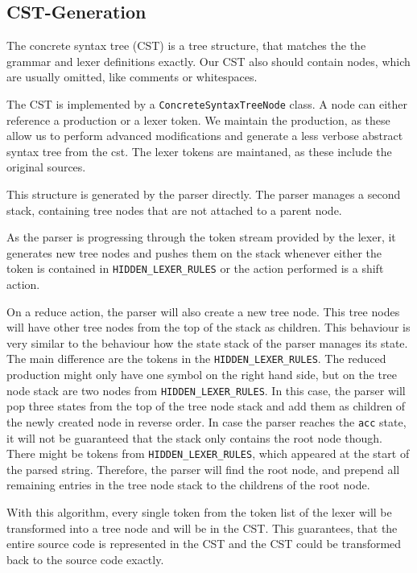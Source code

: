 \subsection{CST-Generation}

The concrete syntax tree (CST) is a tree structure, that matches the the grammar and lexer definitions exactly. Our CST also should contain nodes, which are usually omitted, like comments or whitespaces.

The CST is implemented by a \verb|ConcreteSyntaxTreeNode| class. A node can either reference a production or a lexer token. We maintain the production, as these allow us to perform advanced modifications and generate a less verbose abstract syntax tree from the cst. The lexer tokens are maintaned, as these include the original sources.

This structure is generated by the parser directly. The parser manages a second stack, containing tree nodes that are not attached to a parent node.

As the parser is progressing through the token stream provided by the lexer, it generates new tree nodes and pushes them on the stack whenever either the token is contained in \verb|HIDDEN_LEXER_RULES| or the action performed is a shift action. 

On a reduce action, the parser will also create a new tree node. This tree nodes will have other tree nodes from the top of the stack as children. This behaviour is very similar to the behaviour how the state stack of the parser manages its state. The main difference are the tokens in the \verb|HIDDEN_LEXER_RULES|. The reduced production might only have one symbol on the right hand side, but on the tree node stack are two nodes from \verb|HIDDEN_LEXER_RULES|. In this case, the parser will pop three states from the top of the tree node stack and add them as children of the newly created node in reverse order. In case the parser reaches the \verb|acc| state, it will not be guaranteed that the stack only contains the root node though. There might be tokens from \verb|HIDDEN_LEXER_RULES|, which appeared at the start of the parsed string. Therefore, the parser will find the root node, and prepend all remaining entries in the tree node stack to the childrens of the root node. 

With this algorithm, every single token from the token list of the lexer will be transformed into a tree node and will be in the CST. This guarantees, that the entire source code is represented in the CST and the CST could be transformed back to the source code exactly.

